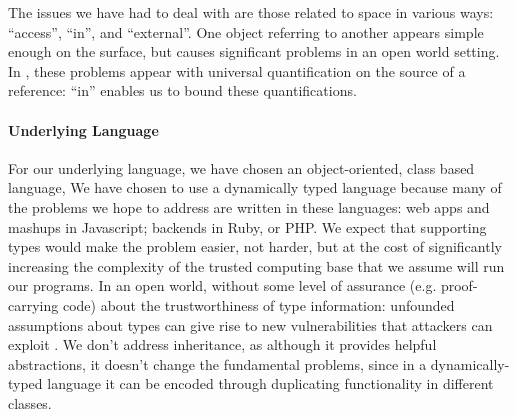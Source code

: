 

The issues we have had to deal with are those related to space in
various ways: ``access'', ``in'', and ``external''.  One object
referring to another appears simple enough on the surface, but causes
significant problems in an open world setting. In \Chainmail, these
problems appear with universal quantification on the source of a
reference: ``in'' enables us to bound these quantifications.



\paragraph{Underlying Language}


For our underlying language, we have chosen an object-oriented, class based language,
%
We have chosen to use a dynamically typed language because many of the
problems we hope to address are written in these
languages: web apps and mashups in Javascript; backends in Ruby, or
PHP.  We expect that supporting types would make the problem easier,
not harder, but at the cost of significantly increasing the complexity
of the trusted computing base that we assume will run our programs. In
an open world, without some level of assurance (e.g. proof-carrying
code) about the trustworthiness of type information: unfounded
assumptions about types can give rise to new vulnerabilities that
attackers can exploit \cite{pickles}. We don't address inheritance, as although it provides helpful abstractions, it doesn't change the fundamental problems, since in a dynamically-typed language it can be encoded through duplicating functionality in different classes.

